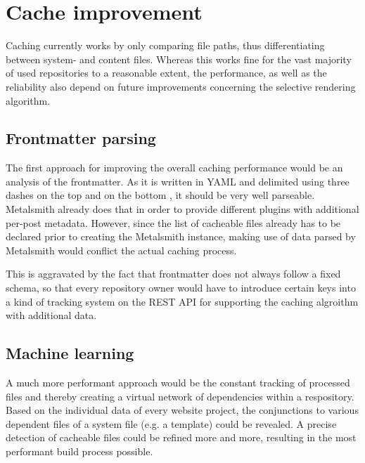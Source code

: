 \section{Cache improvement}
\label{sec:cacheimprovement}

Caching currently works by only comparing file paths, thus differentiating between system- and content files. Whereas this works fine for the vast majority of used repositories to a reasonable extent, the performance, as well as the reliability also depend on future improvements concerning the selective rendering algorithm.

\subsection{Frontmatter parsing}
The first approach for improving the overall caching performance would be an analysis of the frontmatter. As it is written in YAML and delimited using three dashes on the top and on the bottom \cite[77]{dhillon2016}, it should be very well parseable. Metalsmith already does that in order to provide different plugins with additional per-post metadata. However, since the list of cacheable files already has to be declared prior to creating the Metalsmith instance, making use of data parsed by Metalsmith would conflict the actual caching process.

This is aggravated by the fact that frontmatter does not always follow a fixed schema, so that every repository owner would have to introduce certain keys into a kind of tracking system on the REST API for supporting the caching algroithm with additional data.

\subsection{Machine learning}
A much more performant approach would be the constant tracking of processed files and thereby creating a virtual network of dependencies within a respository. Based on the individual data of every website project, the conjunctions to various dependent files of a system file (e.g. a template) could be revealed. A precise detection of cacheable files could be refined more and more, resulting in the most performant build process possible.
